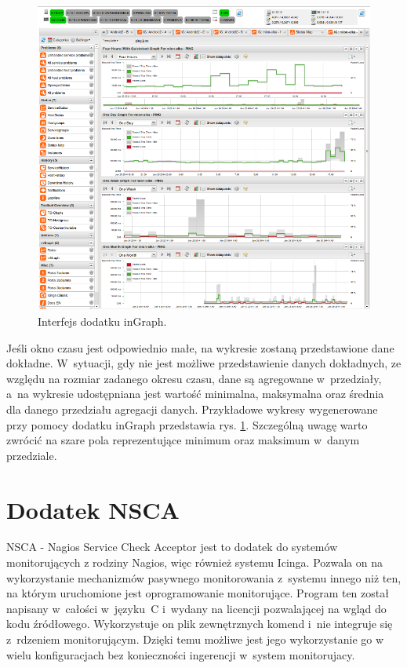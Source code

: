 \begin{figure}[ht]
  \caption{Interfejs dodatku inGraph.}
  \label{fig:inGraph}
\includegraphics[width=1\textwidth]{img/ingraph.png}
\end{figure}

Jeśli okno czasu jest odpowiednio małe, na wykresie zostaną
przedstawione dane dokładne. W~sytuacji, gdy nie jest możliwe
przedstawienie danych dokładnych, ze względu na rozmiar zadanego
okresu czasu, dane są agregowane w~przedziały, a~na wykresie
udostępniana jest wartość minimalna, maksymalna oraz średnia dla
danego przedziału agregacji danych. Przykładowe wykresy wygenerowane
przy pomocy dodatku inGraph przedstawia
rys. \ref{fig:inGraph}. Szczególną uwagę warto zwrócić na szare pola
reprezentujące minimum oraz maksimum w~danym przedziale.


\section[Dodatek NSCA][Dodatek NSCA]{Dodatek NSCA}
\label{sec:NSCA}

NSCA - Nagios Service Check Acceptor jest to dodatek do systemów
monitorujących z rodziny Nagios, więc również systemu Icinga. Pozwala
on na wykorzystanie mechanizmów pasywnego monitorowania z~systemu
innego niż ten, na którym uruchomione jest oprogramowanie
monitorujące. Program ten został napisany w~całości w~języku~C
i~wydany na licencji pozwalającej na wgląd do kodu
źródłowego. Wykorzystuje on plik zewnętrznych komend i~nie integruje
się z~rdzeniem monitorującym. Dzięki temu możliwe jest jego
wykorzystanie go w wielu konfiguracjach bez konieczności ingerencji
w~system monitorujacy.

